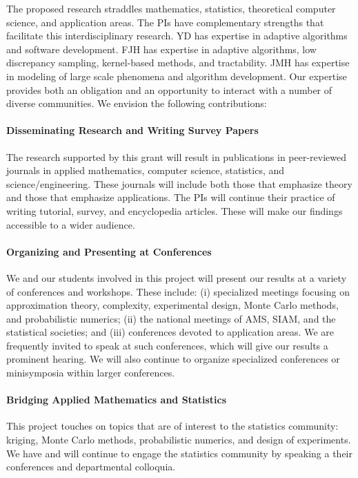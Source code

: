 \documentclass[11pt]{NSFamsart}
\begin{document}
The proposed research straddles mathematics, statistics, theoretical computer science, and 
application areas.  The PIs have complementary strengths that facilitate this interdisciplinary research.  YD has expertise in adaptive algorithms and software development.  FJH has expertise in adaptive algorithms, low discrepancy sampling, kernel-based methods, and tractability. JMH has expertise in modeling of large scale phenomena and algorithm development.  Our 
expertise provides both an obligation and an opportunity to interact with a number of diverse 
communities. We envision the following contributions:

\paragraph*{Disseminating Research and Writing Survey Papers}
The research supported by this grant will result in publications in peer-reviewed journals in applied mathematics, computer science, statistics, and science/engineering. These 
journals will include both those that emphasize theory and those that emphasize applications.  The PIs will continue their practice of writing tutorial, survey, and encyclopedia articles.  These will make our findings accessible to a wider audience.


\paragraph*{Organizing and Presenting at Conferences}
We and our students involved in this project will present our results at a variety of conferences and workshops.  These include: (i) specialized meetings focusing on approximation theory, complexity, 
experimental design, Monte Carlo methods, and probabilistic numerics; (ii) the national meetings of AMS, SIAM, and the 
statistical societies; and (iii) conferences devoted to application areas.  We are frequently invited to 
speak at such conferences, which will give our results a prominent hearing. We will also continue to 
organize specialized conferences or minisymposia within larger conferences.

\paragraph*{Bridging Applied Mathematics and Statistics}
This project touches on topics that are of interest to the statistics community: kriging, Monte Carlo methods, probabilistic numerics, and design of experiments.  We have and will continue to engage the statistics community 
by speaking a their conferences and departmental colloquia.
\end{document}
